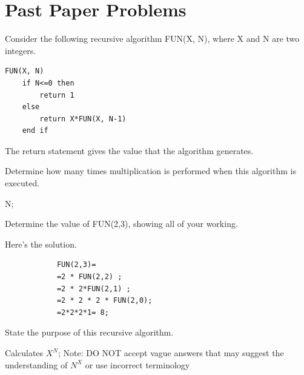 \section{Past Paper Problems}

\begin{exercise*} %
Consider the following recursive algorithm FUN(X, N), where X and N are two integers.	
	\begin{Verbatim}[tabsize=4]
	FUN(X, N)
	if N<=0 then
		return 1
	else
		return X*FUN(X, N-1)
	end if
	\end{Verbatim}
	The return statement gives the value that the algorithm generates.
	
	\begin{parts}
		\item Determine how many times multiplication is performed when this algorithm is executed.
		\begin{solution}
			N;
		\end{solution}
		\item Determine the value of FUN(2,3), showing all of your working.
		\begin{solution}
			Here's the solution.
			\begin{verbatim}
			FUN(2,3)=
			=2 * FUN(2,2) ;
			=2 * 2*FUN(2,1) ;
			=2 * 2 * 2 * FUN(2,0);
			=2*2*2*1= 8;
			\end{verbatim}
		\end{solution}
		\item State the purpose of this recursive algorithm.
		\begin{solution}
			Calculates $X^N$; Note: DO NOT accept vague answers that may suggest the understanding of $N^X$ or use incorrect terminology
		\end{solution}
	\end{parts}
\end{exercise*}



